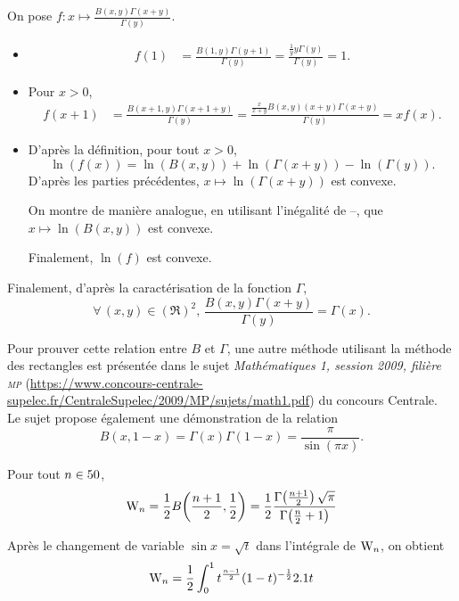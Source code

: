 \begin{demo}
On pose $f : x \mapsto \frac{B(x, y) \Gamma(x + y)}{\Gamma(y)}$.
\begin{itemize}
\item
\begin{align*}
f(1)
&= \frac{B(1, y) \Gamma(y + 1)}{\Gamma(y)}
= \frac{\frac{1}{y} y \Gamma(y)}{\Gamma(y)}
= 1.
\end{align*}

\item Pour $x > 0$,
\begin{align*}
f(x + 1)
&= \frac{B(x + 1, y) \Gamma(x + 1 + y)}{\Gamma(y)}
= \frac{\frac{x}{x + y} B(x, y) (x + y) \Gamma(x + y)}{\Gamma(y)}
= x f(x).
\end{align*}

\item D'après la définition, pour tout $x > 0$,
\[
\ln(f(x)) = \ln(B(x, y)) + \ln(\Gamma(x + y)) - \ln(\Gamma(y)).
\]
D'après les parties précédentes, $x \mapsto \ln(\Gamma(x + y))$ est convexe.

On montre de manière analogue, en utilisant l'inégalité de --, que $x \mapsto \ln(B(x, y))$ est convexe.

Finalement, $\ln(f)$ est convexe.
\end{itemize}
Finalement, d'après la caractérisation de la fonction $\Gamma$,
\[
\forall\, (x, y) \in (\Re)^2,\,
\frac{B(x, y) \Gamma(x + y)}{\Gamma(y)} = \Gamma(x).
\]
\end{demo}

\begin{remarque}
Pour prouver cette relation entre $B$ et $\Gamma$, une autre méthode utilisant la méthode des rectangles est présentée dans le sujet \textsl{Mathématiques 1, session 2009, filière \textsc{mp}} (\url{https://www.concours-centrale-supelec.fr/CentraleSupelec/2009/MP/sujets/math1.pdf}) du concours Centrale. \\
Le sujet propose également une démonstration de la relation 
\[
B(x, 1 - x) = \Gamma(x) \Gamma(1 - x) = \frac{\pi}{\sin(\pi x)}.
\]
\end{remarque}


\begin{theo}{}
Pour tout $n \in 50$,
\[
\mathrm{W}_n = \frac{1}{2} B\mathopen{}\left(\frac{n+1}{2}, \frac{1}{2} \right) = \frac{1}{2} \frac{\Gamma\mathopen{}\left(\frac{n+1}{2}\right) \sqrt{\pi}}{\Gamma\mathopen{}\left(\frac{n}{2}+1\right)}
\]
\end{theo}

\begin{elemdemo}
Après le changement de variable $\sin x = \sqrt{t}$ dans l'intégrale de  $\mathrm{W}_n$, on obtient
\[
\mathrm{W}_n = \frac{1}{2} \int_0^1 t^{\frac{n-1}{2}} (1-t)^{-\frac{1}{2}} 2.1 t
\]
\end{elemdemo}
